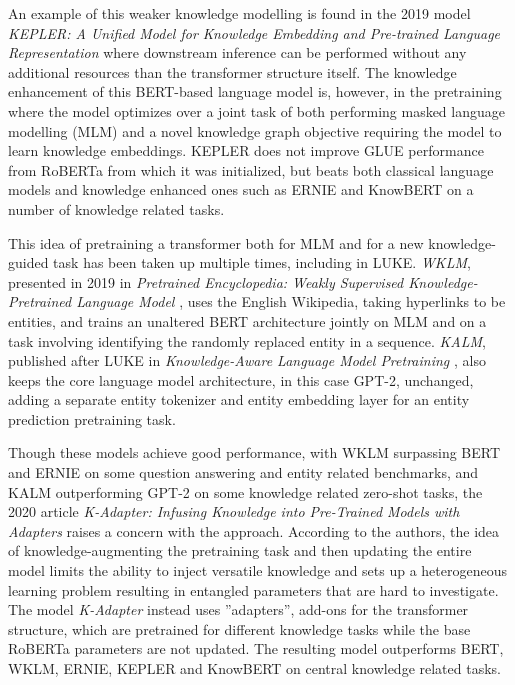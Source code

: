 \documentclass[main.tex]{subfiles}
\begin{document}
An example of this weaker knowledge modelling is found in the 2019 model \emph{KEPLER: A Unified Model for Knowledge Embedding and Pre-trained Language Representation} \cite{wang2021kepler} where downstream inference can be performed without any additional resources than the transformer structure itself.
The knowledge enhancement of this BERT-based language model is, however, in the pretraining where the model optimizes over a joint task of both performing masked language modelling (MLM) and a novel knowledge graph objective requiring the model to learn knowledge embeddings.
KEPLER does not improve GLUE performance from RoBERTa \cite{liu2019roberta} from which it was initialized, but beats both classical language models and knowledge enhanced ones such as ERNIE and KnowBERT on a number of knowledge related tasks.

This idea of pretraining a transformer both for MLM and for a new knowledge-guided task has been taken up multiple times, including in LUKE.
\emph{WKLM}, presented in 2019 in \emph{Pretrained Encyclopedia: Weakly Supervised Knowledge-Pretrained Language Model} \cite{xiong2019wklm}, uses the English Wikipedia, taking hyperlinks to be entities, and trains an unaltered BERT architecture jointly on MLM and on a task involving identifying the randomly replaced entity in a sequence.
\emph{KALM}, published after LUKE in \emph{Knowledge-Aware Language Model Pretraining} \cite{corby2020kalm}, also keeps the core language model architecture, in this case GPT-2, unchanged, adding a separate entity tokenizer and entity embedding layer for an entity prediction pretraining task.

Though these models achieve good performance, with WKLM surpassing BERT and ERNIE on some question answering and entity related benchmarks, and KALM outperforming GPT-2 on some knowledge related zero-shot tasks, the 2020 article \emph{K-Adapter: Infusing Knowledge into Pre-Trained Models with Adapters} \cite{wang2020kadapter} raises a concern with the approach.
According to the authors, the idea of knowledge-augmenting the pretraining task and then updating the entire model limits the ability to inject versatile knowledge and sets up a heterogeneous learning problem resulting in entangled parameters that are hard to investigate.
The model \emph{K-Adapter} instead uses ''adapters'', add-ons for the transformer structure, which are pretrained for different knowledge tasks while the base RoBERTa parameters are not updated.
The resulting model outperforms BERT, WKLM, ERNIE, KEPLER and KnowBERT on central knowledge related tasks.
\end{document}
